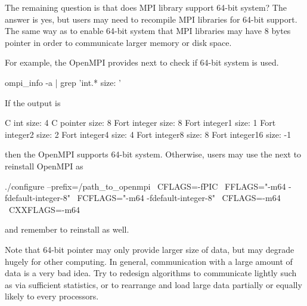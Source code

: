 The remaining question is that does MPI library support 64-bit system?
The answer is yes, but users may need to recompile MPI libraries for
64-bit support.
The same way as  to enable 64-bit system that MPI libraries
may have 8 bytes pointer in order to communicate larger memory or disk space.

For example, the OpenMPI provides next to check if 64-bit system is used.
\begin{Command}
ompi_info -a | grep 'int.* size: '
\end{Command}
If the output is
\begin{Command}
              C int size: 4
          C pointer size: 8
       Fort integer size: 8
      Fort integer1 size: 1
      Fort integer2 size: 2
      Fort integer4 size: 4
      Fort integer8 size: 8
     Fort integer16 size: -1
\end{Command}
then the OpenMPI supports 64-bit system.
Otherwise, users may use the next to reinstall OpenMPI as
\begin{Command}
./configure --prefix=/path_to_openmpi \
            CFLAGS=-fPIC \
            FFLAGS="-m64 -fdefault-integer-8" \
            FCFLAGS="-m64 -fdefault-integer-8" \
            CFLAGS=-m64 \
            CXXFLAGS=-m64
\end{Command}
and remember to reinstall \pkg{pbdMPI} as well.

Note that 64-bit pointer may only provide larger size of data, but
may degrade hugely for other computing. In general, communication with a
large amount of data is a very bad idea. Try to redesign algorithms to
communicate lightly such as via sufficient statistics, or to rearrange and
load large data partially or equally likely to every processors.
